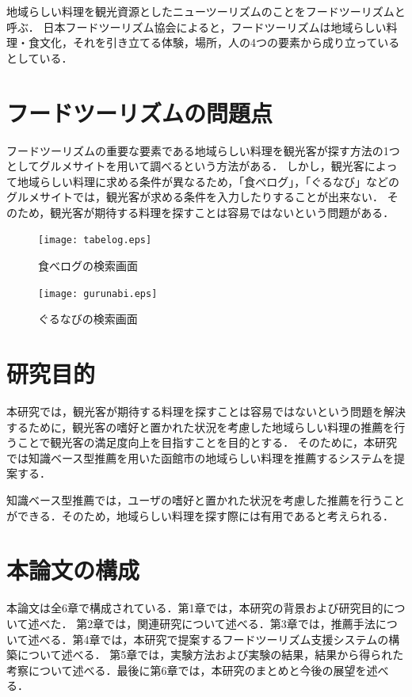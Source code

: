 \documentclass{funthesis}
\begin{document}
地域らしい料理を観光資源としたニューツーリズムのことをフードツーリズムと呼ぶ．
日本フードツーリズム協会によると，フードツーリズムは地域らしい料理・食文化，それを引き立てる体験，場所，人の4つの要素から成り立っているとしている．

\section{フードツーリズムの問題点}
フードツーリズムの重要な要素である地域らしい料理を観光客が探す方法の1つとしてグルメサイトを用いて調べるという方法がある．
しかし，観光客によって地域らしい料理に求める条件が異なるため，「食べログ」\cite{4}，「ぐるなび」\cite{5}などのグルメサイトでは，観光客が求める条件を入力したりすることが出来ない．
そのため，観光客が期待する料理を探すことは容易ではないという問題がある．

\begin{figure}[bp]
  \begin{center}
    \texttt{[image: tabelog.eps]}
    \caption{食べログの検索画面\cite{4}}
  \end{center}
\end{figure}

\begin{figure}[tbp]
  \begin{center}
    \texttt{[image: gurunabi.eps]}
    \caption{ぐるなびの検索画面\cite{5}}
  \end{center}
\end{figure}

\section{研究目的}  
本研究では，観光客が期待する料理を探すことは容易ではないという問題を解決するために，観光客の嗜好と置かれた状況を考慮した地域らしい料理の推薦を行うことで観光客の満足度向上を目指すことを目的とする．
そのために，本研究では知識ベース型推薦を用いた函館市の地域らしい料理を推薦するシステムを提案する．

知識ベース型推薦では，ユーザの嗜好と置かれた状況を考慮した推薦を行うことができる．そのため，地域らしい料理を探す際には有用であると考えられる．

\section{本論文の構成}
本論文は全6章で構成されている．第1章では，本研究の背景および研究目的について述べた．
第2章では，関連研究について述べる．第3章では，推薦手法について述べる．第4章では，本研究で提案するフードツーリズム支援システムの構築について述べる．
第5章では，実験方法および実験の結果，結果から得られた考察について述べる．最後に第6章では，本研究のまとめと今後の展望を述べる．
\end{document}
